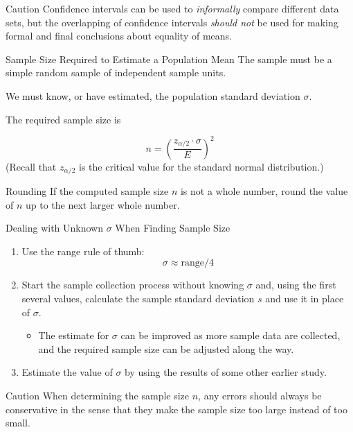 \documentclass{beamer}
\begin{document}
\begin{frame}
\begin{block}{Caution}
Confidence intervals can be used to \emph{informally} compare different data sets, but the overlapping of confidence intervals \emph{should not } be used for making formal and final conclusions about equality of means.
\end{block}\pause

\begin{block}{Sample Size Required to Estimate a Population Mean}
The sample must be a simple random sample of independent sample units.\pause

\vspace{2mm}
We must know, or have estimated, the population standard deviation $\sigma$.\pause

\vspace{2mm}
The required sample size is

\vspace{-2mm}
\begin{equation*}
n={\left(\dfrac{z_{\alpha/2}\cdot\sigma}{E}\right)}^2
\end{equation*}
(Recall that $z_{\alpha/2}$ is the critical value for the standard normal distribution.)
\end{block}\pause

\begin{block}{Rounding}
If the computed sample size $n$ is not a whole number, round the value of $n$ up to the next larger whole number.
\end{block}
\end{frame}

\begin{frame}
\begin{block}{Dealing with Unknown $\sigma$ When Finding Sample Size}
\begin{enumerate}[<+- | alert@+>]
\item Use the range rule of thumb:
\begin{equation*}
\sigma\approx \text{range}/4
\end{equation*}
\item Start the sample collection process without knowing $\sigma$ and, using the first several values, calculate the sample standard deviation $s$ and use it in place of $\sigma$.
\begin{itemize}
\item The estimate for $\sigma$ can be improved as more sample data are collected, and the required sample size can be adjusted along the way.
\end{itemize}
\item Estimate the value of $\sigma$ by using the results of some other earlier study.
\end{enumerate}
\end{block}

\onslide<+->
\begin{block}{Caution}
When determining the sample size $n$, any errors should always be conservative in the sense that they make the sample size too large instead of too small.
\end{block}
\end{frame}
\end{document}

